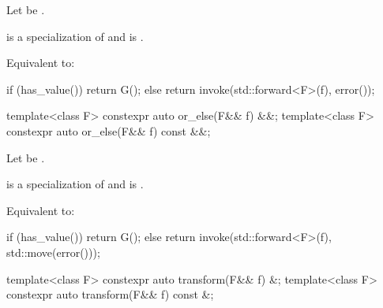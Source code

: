 \begin{itemdescr}
\pnum
Let  be .

\pnum
\mandates
{} is a specialization of  and
 is .

\pnum
\effects
Equivalent to:
\begin{codeblock}
if (has_value())
  return G();
else
  return invoke(std::forward<F>(f), error());
\end{codeblock}
\end{itemdescr}

%
\begin{itemdecl}
template<class F> constexpr auto or_else(F&& f) &&;
template<class F> constexpr auto or_else(F&& f) const &&;
\end{itemdecl}

\begin{itemdescr}
\pnum
Let  be
.

\pnum
\mandates
{} is a specialization of  and
 is .

\pnum
\effects
Equivalent to:
\begin{codeblock}
if (has_value())
  return G();
else
  return invoke(std::forward<F>(f), std::move(error()));
\end{codeblock}
\end{itemdescr}

%
\begin{itemdecl}
template<class F> constexpr auto transform(F&& f) &;
template<class F> constexpr auto transform(F&& f) const &;
\end{itemdecl}


